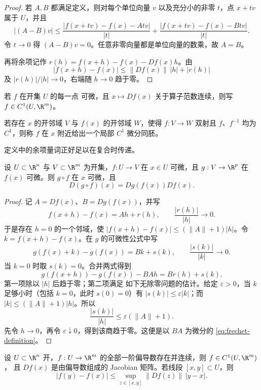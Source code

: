 \begin{proof}
若 $A,B$ 都满足定义，则对每个单位向量 $v$ 以及充分小的非零 $t$，点 $x+tv$ 属于 $U$，并且
\[
 |(A-B)v|
 \le \frac{|f(x+tv)-f(x)-Atv|}{|t|}
    +\frac{|f(x+tv)-f(x)-Btv|}{|t|}.
\]
令 $t\to0$ 得 $(A-B)v=0$。任意非零向量都是单位向量的数乘，故 $A=B$。

再将余项记作 $r(h)=f(x+h)-f(x)-Df(x)h$。由
\[
 |f(x+h)-f(x)|\le \|Df(x)\|\,|h|+|r(h)|
\]
及 $|r(h)|/|h|\to0$，右端随 $h\to0$ 趋于零。
\end{proof}

\begin{definition}[$C^1$ 映射]\label{def:2-4-1-2}
若 $f$ 在开集 $U$ 的每一点 \Frechet{} 可微，且 $x\mapsto Df(x)$ 关于算子范数连续，则写
$f\in C^1(U,\R^m)$。
\end{definition}

\begin{definition}[局部微分同胚]\label{def:2-4-1-3}
若存在 $x$ 的开邻域 $V$ 与 $f(x)$ 的开邻域 $W$，使得 $f:V\to W$ 双射且 $f$、$f^{-1}$
均为 $C^1$，则称 $f$ 在 $x$ 附近给出一个局部 $C^1$ 微分同胚。
\end{definition}

定义中的余项量词正好足以在复合时传递。

\begin{theorem}[链式法则]\label{theorem:2-4-1-1}
设 $U\subset\R^n$ 与 $V\subset\R^m$ 为开集，$f:U\to V$ 在 $x\in U$ 可微，且
$g:V\to\R^p$ 在 $f(x)$ 可微。则 $g\circ f$ 在 $x$ 可微，且
\[
 D(g\circ f)(x)=Dg(f(x))Df(x).
\]
\end{theorem}

\begin{proof}
记 $A=Df(x)$、$B=Dg(f(x))$，并写
\[
 f(x+h)-f(x)=Ah+r(h),\qquad \frac{|r(h)|}{|h|}\to0.
\]
于是存在 $h=0$ 的一个邻域，使
$|f(x+h)-f(x)|\le(\|A\|+1)|h|$。令 $k=f(x+h)-f(x)$。在 $g$ 的可微性公式中写
\[
 g(f(x)+k)-g(f(x))=Bk+s(k),\qquad \frac{|s(k)|}{|k|}\to0.
\]
当 $k=0$ 时取 $s(k)=0$。合并两式得到
\[
 g(f(x+h))-g(f(x))-BAh=Br(h)+s(k).
\]
第一项除以 $|h|$ 后趋于零；第二项满足
如下无除零问题的估计。给定 $\varepsilon>0$，当 $k$ 足够小时（包括 $k=0$，此时 $s(0)=0$）有
$|s(k)|\le\varepsilon|k|$；而 $|k|\le(\|A\|+1)|h|$。所以
\[
 \frac{|s(k)|}{|h|}\le\varepsilon(\|A\|+1).
\]
先令 $h\to0$，再令 $\varepsilon\downarrow0$，得到该商趋于零。这便是以 $BA$ 为微分的
\eqref{eq:frechet-definition}。
\end{proof}

\begin{proposition}[$C^1$ 判据与均值估计]\label{proposition:2-4-1-2}
设 $U\subset\R^n$ 开，$f:U\to\R^m$ 的全部一阶偏导数存在并连续，则 $f\in C^1(U,\R^m)$，
且 $Df(x)$ 是由偏导数组成的 Jacobian 矩阵。若线段 $[x,y]\subset U$，则
\[
 |f(y)-f(x)|
 \le \sup_{z\in[x,y]}\|Df(z)\|\,|y-x|.
 \tag{2.4.2}\label{eq:vector-mean-estimate}
\]
\end{proposition}

